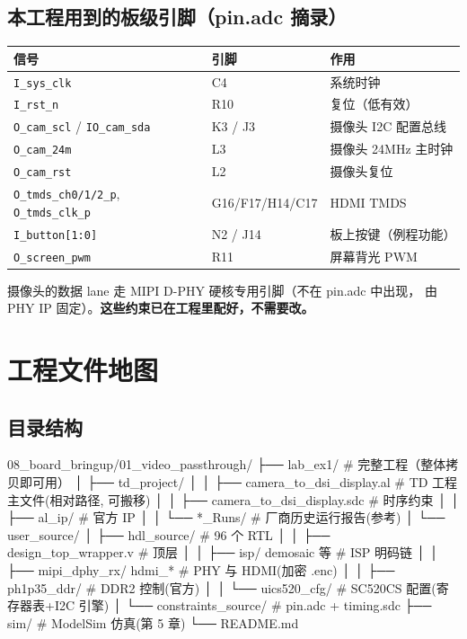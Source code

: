 \documentclass[11pt]{ctexart}
\newcommand{\code}[1]{\texttt{#1}}
\begin{document}
\subsection{本工程用到的板级引脚（pin.adc 摘录）}

\begin{center}
\begin{tabular}{lll}
\toprule
\rowcolor{rowtint}\textbf{信号} & \textbf{引脚} & \textbf{作用} \\
\midrule
\code{I\_sys\_clk} & C4 & 系统时钟 \\
\code{I\_rst\_n} & R10 & 复位（低有效） \\
\code{O\_cam\_scl} / \code{IO\_cam\_sda} & K3 / J3 & 摄像头 I2C 配置总线 \\
\code{O\_cam\_24m} & L3 & 摄像头 24MHz 主时钟 \\
\code{O\_cam\_rst} & L2 & 摄像头复位 \\
\code{O\_tmds\_ch0/1/2\_p}, \code{O\_tmds\_clk\_p} & G16/F17/H14/C17 & HDMI TMDS \\
\code{I\_button[1:0]} & N2 / J14 & 板上按键（例程功能） \\
\code{O\_screen\_pwm} & R11 & 屏幕背光 PWM \\
\bottomrule
\end{tabular}
\end{center}

摄像头的数据 lane 走 MIPI D-PHY 硬核专用引脚（不在 pin.adc 中出现，
由 PHY IP 固定）。\textbf{这些约束已在工程里配好，不需要改。}

\section{工程文件地图}

\subsection{目录结构}

\begin{Verilog}
08_board_bringup/01_video_passthrough/
├── lab_ex1/                          # 完整工程（整体拷贝即可用）
│   ├── td_project/
│   │   ├── camera_to_dsi_display.al  # TD 工程主文件(相对路径, 可搬移)
│   │   ├── camera_to_dsi_display.sdc # 时序约束
│   │   ├── al_ip/                    # 官方 IP
│   │   └── *_Runs/                   # 厂商历史运行报告(参考)
│   └── user_source/
│       ├── hdl_source/               # 96 个 RTL
│       │   ├── design_top_wrapper.v  # 顶层
│       │   ├── isp/ demosaic 等      # ISP 明码链
│       │   ├── mipi_dphy_rx/ hdmi_*  # PHY 与 HDMI(加密 .enc)
│       │   ├── ph1p35_ddr/           # DDR2 控制(官方)
│       │   └── uics520_cfg/          # SC520CS 配置(寄存器表+I2C 引擎)
│       └── constraints_source/       # pin.adc + timing.sdc
├── sim/                              # ModelSim 仿真(第 5 章)
└── README.md
\end{Verilog}
\end{document}
